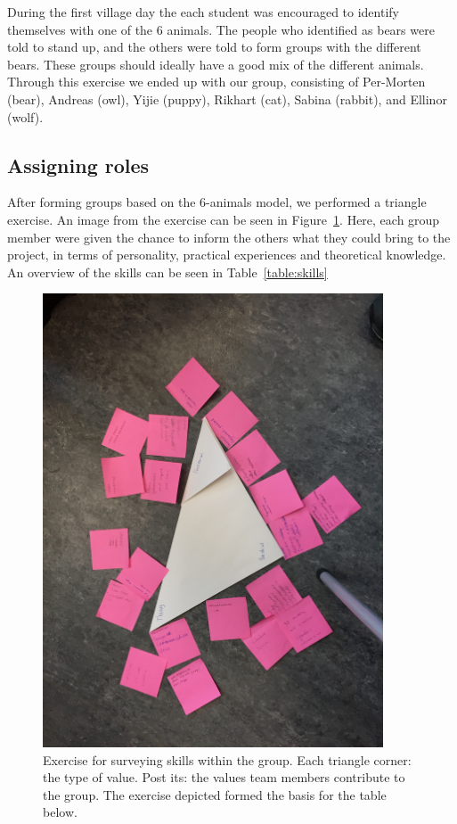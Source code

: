 During the first village day the each student was encouraged to identify themselves with one of the 6 animals. The people who identified as bears were told to stand up, and the others were told to form groups with the different bears. These groups should ideally have a good mix of the different animals. Through this exercise we ended up with our group, consisting of
Per-Morten (bear), Andreas (owl), Yijie (puppy), Rikhart (cat), Sabina (rabbit), and Ellinor (wolf). 


\subsection{Assigning roles} \label{sec:assigning_roles}
After forming groups based on the 6-animals model, we performed a triangle exercise. An image from the exercise can be seen in Figure~\ref{fig:triangle_exercise}. Here, each group member were given the chance to inform the others what they could bring to the project, in terms of personality,  practical experiences and theoretical knowledge. An overview of the skills can be seen in Table~\ref{table:skills}

\begin{figure}[h]
    \centering
    \includegraphics[width=0.9\textwidth]{images/triangle_exercise}
    \caption[Exercise for surveying skills within the group.]{Exercise for surveying skills within the group. Each triangle corner: the type of value. Post its: the values team members contribute to the group. The exercise depicted formed the basis for the table below.}
    \label{fig:triangle_exercise}
\end{figure}

